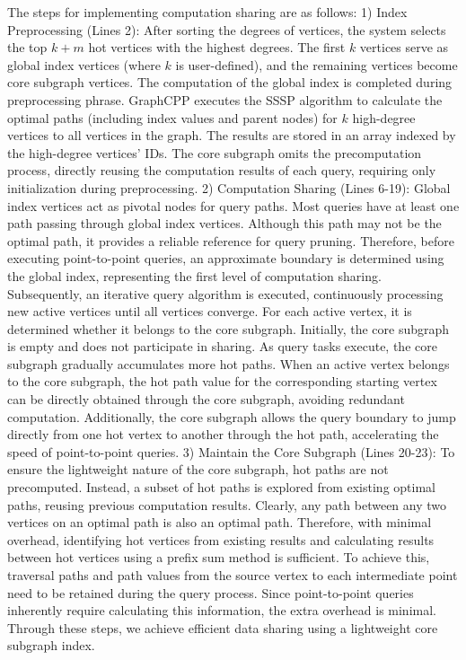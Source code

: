 \documentclass[lettersize,journal]{IEEEtran} %
\begin{document}
The steps for implementing computation sharing are as follows:
1) Index Preprocessing (Lines 2): After sorting the degrees of vertices, the system selects the top $k+m$ hot vertices with the highest degrees. The first $k$ vertices serve as global index vertices (where $k$ is user-defined), and the remaining vertices become core subgraph vertices. The computation of the global index is completed during preprocessing phrase. GraphCPP executes the SSSP algorithm to calculate the optimal paths (including index values and parent nodes) for $k$ high-degree vertices to all vertices in the graph. The results are stored in an array indexed by the high-degree vertices' IDs. The core subgraph omits the precomputation process, directly reusing the computation results of each query, requiring only initialization during preprocessing.
2) Computation Sharing (Lines 6-19): Global index vertices act as pivotal nodes for query paths. Most queries have at least one path passing through global index vertices. Although this path may not be the optimal path, it provides a reliable reference for query pruning. Therefore, before executing point-to-point queries, an approximate boundary is determined using the global index, representing the first level of computation sharing. Subsequently, an iterative query algorithm is executed, continuously processing new active vertices until all vertices converge. For each active vertex, it is determined whether it belongs to the core subgraph. Initially, the core subgraph is empty and does not participate in sharing. As query tasks execute, the core subgraph gradually accumulates more hot paths. When an active vertex belongs to the core subgraph, the hot path value for the corresponding starting vertex can be directly obtained through the core subgraph, avoiding redundant computation. Additionally, the core subgraph allows the query boundary to jump directly from one hot vertex to another through the hot path, accelerating the speed of point-to-point queries.
3) Maintain the Core Subgraph (Lines 20-23): To ensure the lightweight nature of the core subgraph, hot paths are not precomputed. Instead, a subset of hot paths is explored from existing optimal paths, reusing previous computation results. Clearly, any path between any two vertices on an optimal path is also an optimal path. Therefore, with minimal overhead, identifying hot vertices from existing results and calculating results between hot vertices using a prefix sum method is sufficient. To achieve this, traversal paths and path values from the source vertex to each intermediate point need to be retained during the query process. Since point-to-point queries inherently require calculating this information, the extra overhead is minimal. Through these steps, we achieve efficient data sharing using a lightweight core subgraph index.
\end{document}
